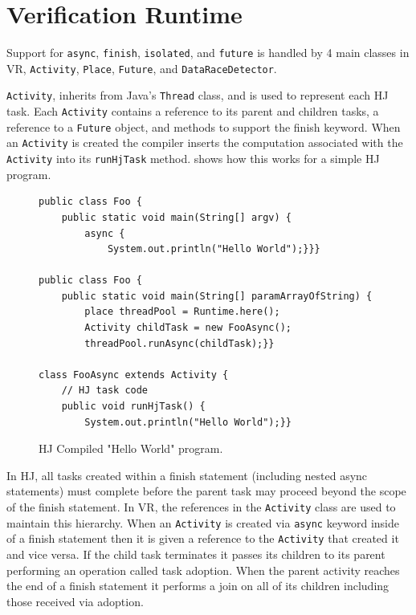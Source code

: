 \section{Verification Runtime}
Support for \texttt{async}, \texttt{finish}, \texttt{isolated}, and \texttt{future} is handled by 4 main classes in VR, \texttt{Activity}, \texttt{Place}, \texttt{Future}, and \texttt{DataRaceDetector}. 

\texttt{Activity}, inherits from Java's \texttt{Thread} class, and is used to represent each HJ task. Each \texttt{Activity} contains a reference to its parent and children tasks, a reference to a \texttt{Future} object, and methods to support the finish keyword. When an \texttt{Activity} is created the compiler inserts the computation associated with the \texttt{Activity} into its \texttt{runHjTask} method.  shows how this works for a simple HJ program.

\begin{figure}[t]
\begin{center}
{\small
\begin{verbatim}
public class Foo {
    public static void main(String[] argv) {
        async {
            System.out.println("Hello World");}}}

public class Foo {
    public static void main(String[] paramArrayOfString) {
        place threadPool = Runtime.here();
        Activity childTask = new FooAsync();
        threadPool.runAsync(childTask);}}

class FooAsync extends Activity {
    // HJ task code
    public void runHjTask() {
        System.out.println("Hello World");}}
\end{verbatim}
}
\end{center}
\vspace{-10pt}
\caption{HJ Compiled "Hello World" program.}
\label{fig:hello-world}
\end{figure}

In HJ, all tasks created within a finish statement (including nested async statements) must complete before the parent task may proceed beyond the scope of the finish statement. In VR, the references in the \texttt{Activity} class are used to maintain this hierarchy. When an \texttt{Activity} is created via \texttt{async} keyword inside of a finish statement then it is given a reference to the \texttt{Activity} that created it and vice versa. If the child task terminates it passes its children to its parent performing an operation called task adoption. When the parent activity reaches the end of a finish statement it performs a join on all of its children including those received via adoption. 

